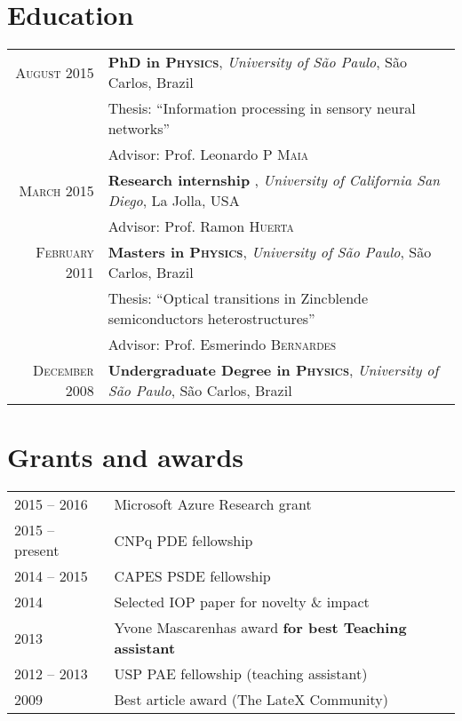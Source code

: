 \documentclass[letter,10pt]{article} %
\begin{document}
\section{Education}

\begin{tabular}{rp{12cm}}
  \textsc{August} 2015 & {\bf PhD in \textsc{Physics}}, \textit{University of S\~ao Paulo}, S\~ao Carlos, Brazil\\
  & Thesis: ``Information processing in sensory neural networks'' \\
  & \small Advisor: Prof. Leonardo P \textsc{Maia} \\

  \textsc{March} 2015 & {\bf Research internship }, \textit{University of California San Diego}, La Jolla, USA\\
  & \small Advisor: Prof. Ramon \textsc{Huerta} \\

  \textsc{February} 2011 & {\bf Masters in \textsc{Physics}}, \textit{University of S\~ao Paulo}, S\~ao Carlos, Brazil\\
  & Thesis: ``Optical transitions in Zincblende semiconductors heterostructures'' \\
  & \small Advisor: Prof. Esmerindo \textsc{Bernardes} \\

  \textsc{December} 2008 & {\bf Undergraduate Degree in \textsc{}\textsc{Physics}},
  \textit{University of S\~ao Paulo}, S\~ao Carlos, Brazil \\
\end{tabular}

\section{Grants and awards}

\renewcommand*{\arraystretch}{1.2}

\begin{longtable}{ll}
  2015 -- 2016  & Microsoft Azure Research grant \\
  2015 -- present  & CNPq PDE fellowship \\
  2014 -- 2015   & CAPES PSDE fellowship \\
  2014   & Selected IOP paper for novelty \& impact \\
  2013   & Yvone Mascarenhas award {\bf for best Teaching assistant} \\
  2012 -- 2013 & USP PAE fellowship (teaching assistant) \\
  2009   & Best article award (The LateX Community)
\end{longtable}
\end{document}
